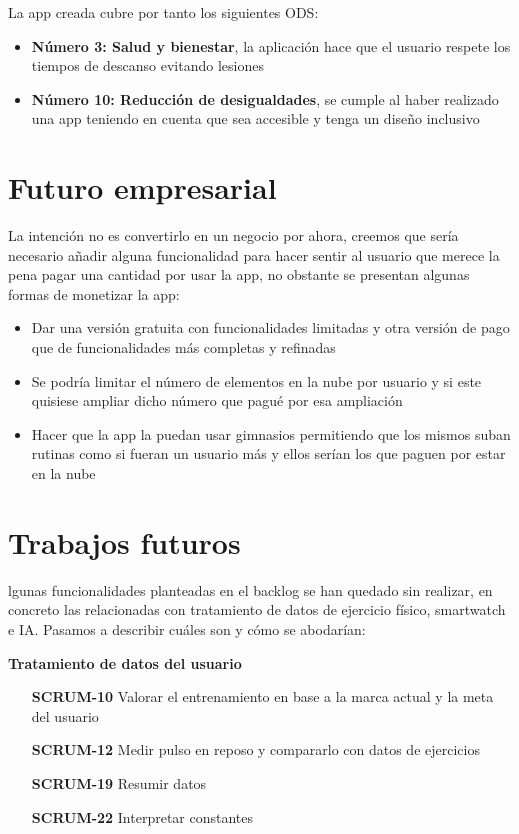 La app creada cubre por tanto los siguientes ODS:
\begin{itemize}
	\item \textbf{Número 3: Salud y bienestar}, la aplicación hace que el usuario respete los tiempos de descanso evitando lesiones
	\item \textbf{Número 10: Reducción de desigualdades}, se cumple al haber realizado una app teniendo en cuenta que sea accesible y tenga un diseño inclusivo
\end{itemize}

\section{Futuro empresarial}

La intención no es convertirlo en un negocio por ahora, creemos que sería necesario añadir alguna funcionalidad para hacer sentir al usuario que merece la pena pagar una cantidad por usar la app, no obstante se presentan algunas formas de monetizar la app:

\begin{itemize}
	\item Dar una versión gratuita con funcionalidades limitadas y otra versión de pago que de funcionalidades más completas y refinadas
	\item Se podría limitar el número de elementos en la nube por usuario y si este quisiese ampliar dicho número que pagué por esa ampliación 
	\item Hacer que la app la puedan usar gimnasios permitiendo que los mismos suban rutinas como si fueran un usuario más y ellos serían los que paguen por estar en la nube
\end{itemize}

\section{Trabajos futuros}

lgunas funcionalidades planteadas en el backlog se han quedado sin realizar, en concreto las relacionadas con tratamiento de datos de ejercicio físico, smartwatch e IA. Pasamos a describir cuáles son y cómo se abodarían:
\hspace{0.5cm}

\textbf{Tratamiento de datos del usuario}
\begin{itemize}
		\item[\textbf{SCRUM-10}] Valorar el entrenamiento en base a la marca actual y la meta del usuario
		\item[\textbf{SCRUM-12}] Medir pulso en reposo y compararlo con datos de ejercicios
		\item[\textbf{SCRUM-19}] Resumir datos
		\item[\textbf{SCRUM-22}] Interpretar constantes
\end{itemize}

